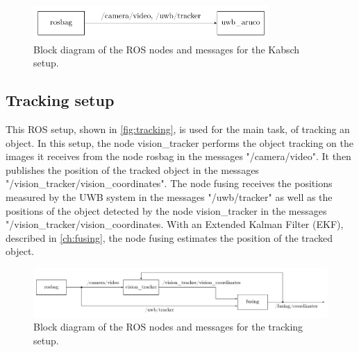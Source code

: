 \begin{figure}[h]\centering
	\includegraphics[width=0.8\textwidth]{figures/blockdiagram_kabsch}
	\caption{Block diagram of the ROS nodes and messages for the Kabsch setup.}\label{fig:kabsch}
\end{figure}

\subsection{Tracking setup}\label{subsec:tracking}
This ROS setup, shown in \autoref{fig:tracking}, is used for the main task, of tracking an object. In this setup, the node vision\_tracker performs the object tracking on the images it receives from the node rosbag in the messages "/camera/video". It then publishes the position of the tracked object in the messages "/vision\_tracker/vision\_coordinates". The node fusing receives the positions measured by the UWB system in the messages "/uwb/tracker" as well as the positions of the object detected by the node vision\_tracker in the messages "/vision\_tracker/vision\_coordinates. With an Extended Kalman Filter (EKF), described in \autoref{ch:fusing}, the node fusing estimates the position of the tracked object.

\begin{figure}[h]\centering
	\includegraphics[width=1.0\textwidth]{figures/blockdiagram_tracking}
	\caption{Block diagram of the ROS nodes and messages for the tracking setup.}\label{fig:tracking}
\end{figure}
